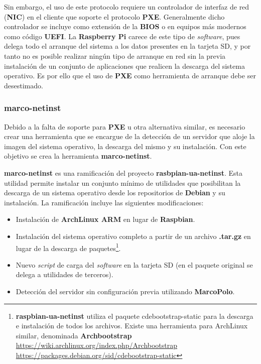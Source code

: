 Sin embargo, el uso de este protocolo requiere un controlador de interfaz de red (\textbf{NIC}) en el cliente que soporte el protocolo \textbf{PXE}. Generalmente dicho controlador se incluye como extensión de la \textbf{BIOS} o en equipos más modernos como código \textbf{UEFI}. La \textbf{Raspberry Pi} carece de este tipo de \textit{software}, pues delega todo el arranque del sistema a los datos presentes en la tarjeta SD, y por tanto no es posible realizar ningún tipo de arranque en red sin la previa instalación de un conjunto de aplicaciones que realicen la descarga del sistema operativo. Es por ello que el uso de \textbf{PXE} como herramienta de arranque debe ser desestimado.

\subsubsection{marco-netinst}

Debido a la falta de soporte para \textbf{PXE} u otra alternativa similar, es necesario crear una herramienta que se encargue de la detección de un servidor que aloje la imagen del sistema operativo, la descarga del mismo y su instalación. Con este objetivo se crea la herramienta \textbf{marco-netinst}.

\textbf{marco-netinst} es una ramificación del proyecto \textbf{rasbpian-ua-netinst}\cite{raspbian-ua-netinst}. Esta utilidad permite instalar un conjunto mínimo de utilidades que posibilitan la descarga de un sistema operativo desde los repositorios de \textbf{Debian} y su instalación. La ramificación incluye las siguientes modificaciones:

\begin{itemize}
	\item Instalación de \textbf{ArchLinux ARM} en lugar de \textbf{Raspbian}.
	\item Instalación del sistema operativo completo a partir de un archivo \textbf{.tar.gz} en lugar de la descarga de paquetes\footnote{\textbf{raspbian-ua-netinst} utiliza el paquete cdebootstrap-static para la descarga e instalación de todos los archivos. Existe una herramienta para ArchLinux similar, denominada \textbf{Archbootstrap}\\
	\href{https://wiki.archlinux.org/index.php/Archbootstrap}{https://wiki.archlinux.org/index.php/Archbootstrap}\\
	\href{https://packages.debian.org/sid/cdebootstrap-static}{https://packages.debian.org/sid/cdebootstrap-static}}.
	\item Nuevo \textit{script} de carga del \textit{software} en la tarjeta SD (en el paquete original se delega a utilidades de terceros).
	\item Detección del servidor sin configuración previa utilizando \textbf{MarcoPolo}.
\end{itemize}

